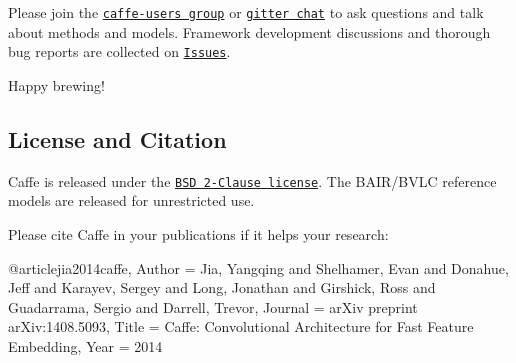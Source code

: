 \href{https://gitter.im/BVLC/caffe?utm_source=badge&utm_medium=badge&utm_campaign=pr-badge&utm_content=badge}{\tt }

Please join the \href{https://groups.google.com/forum/#!forum/caffe-users}{\tt caffe-\/users group} or \href{https://gitter.im/BVLC/caffe}{\tt gitter chat} to ask questions and talk about methods and models. Framework development discussions and thorough bug reports are collected on \href{https://github.com/BVLC/caffe/issues}{\tt Issues}.

Happy brewing!

\subsection*{License and Citation}

Caffe is released under the \href{https://github.com/BVLC/caffe/blob/master/LICENSE}{\tt B\+SD 2-\/\+Clause license}. The B\+A\+I\+R/\+B\+V\+LC reference models are released for unrestricted use.

Please cite Caffe in your publications if it helps your research\+: \begin{DoxyVerb}@article{jia2014caffe,
  Author = {Jia, Yangqing and Shelhamer, Evan and Donahue, Jeff and Karayev, Sergey and Long, Jonathan and Girshick, Ross and Guadarrama, Sergio and Darrell, Trevor},
  Journal = {arXiv preprint arXiv:1408.5093},
  Title = {Caffe: Convolutional Architecture for Fast Feature Embedding},
  Year = {2014}
}\end{DoxyVerb}
 